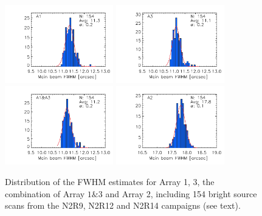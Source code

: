 \begin{figure}[ht!]
\begin{center}
  \includegraphics[clip, width=0.42\textwidth]{Figures/Beams/plot_histo_FWHM_mb_radius_binning2_a1.pdf}
  \includegraphics[clip, width=0.42\textwidth]{Figures/Beams/plot_histo_FWHM_mb_radius_binning2_a3.pdf}
  \includegraphics[clip, width=0.42\textwidth]{Figures/Beams/plot_histo_FWHM_mb_radius_binning2_1mm.pdf}
  \includegraphics[clip, width=0.42\textwidth]{Figures/Beams/plot_histo_FWHM_mb_radius_binning2_a2.pdf}
  \caption[Main Beam FWHM distributions]{Distribution of the FWHM
    estimates for Array 1, 3, the combination of Array $1\&3$ and
    Array 2, including 154 bright source scans from the N2R9, N2R12 and
    N2R14 campaigns (see text). }
\label{fig:fwhm_map}
\end{center}
\end{figure}

